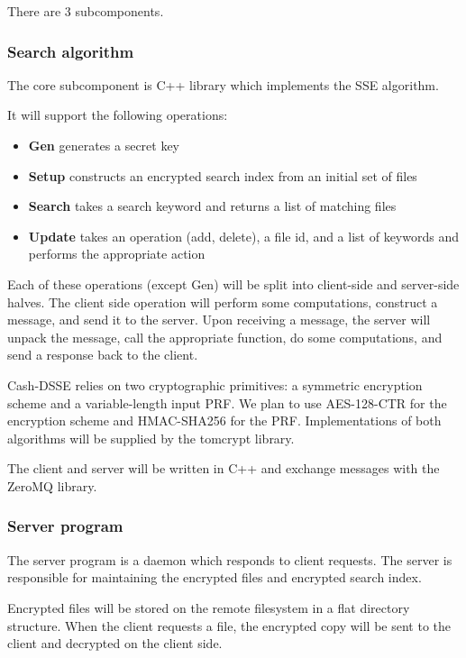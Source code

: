 There are 3 subcomponents.

\subsubsection{ Search algorithm }

The core subcomponent is C++ library which implements the SSE algorithm. 

It will support the following operations:
\begin{itemize}
\item \textbf{Gen} generates a secret key
\item \textbf{Setup} constructs an encrypted search index from an initial set of files
\item \textbf{Search} takes a search keyword and returns a list of matching files
\item \textbf{Update} takes an operation (add, delete), a file id, and a list of keywords and performs the appropriate action
\end{itemize}

Each of these operations (except Gen) will be split into client-side and server-side halves.
The client side operation will perform some computations, construct a message, and send it to the server.
Upon receiving a message, the server will unpack the message, 
call the appropriate function, do some computations,
and send a response back to the client.

Cash-DSSE relies on two cryptographic primitives:
a symmetric encryption scheme and a variable-length input PRF.
We plan to use AES-128-CTR for the encryption scheme and HMAC-SHA256 for the PRF.
Implementations of both algorithms will be supplied by the tomcrypt \cite{tomcrypt} library.

The client and server will be written in C++ and exchange messages with the ZeroMQ library.

\subsubsection{ Server program }

The server program is a daemon which responds to client requests.
The server is responsible for maintaining the encrypted files and encrypted search index.

Encrypted files will be stored on the remote filesystem in a flat directory structure.
When the client requests a file, the encrypted copy will be sent to the client and decrypted on the client side.

